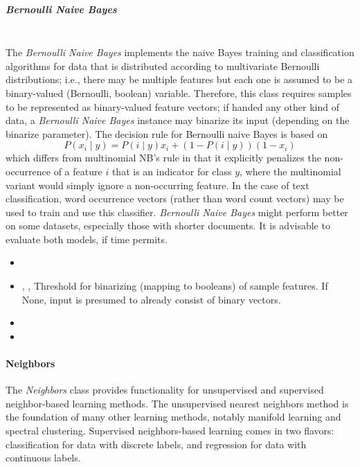 \subparagraph{Bernoulli Naive Bayes}
\mbox{}
\\The \textit{Bernoulli Naive Bayes} implements the naive Bayes training and
classification algorithms for data that is distributed according to multivariate
Bernoulli distributions; i.e., there may be multiple features but each one is
assumed to be a binary-valued (Bernoulli, boolean) variable.
%
Therefore, this class requires samples to be represented as binary-valued
feature vectors; if handed any other kind of data, a \textit{Bernoulli Naive
Bayes} instance may binarize its input (depending on the binarize parameter).
%
The decision rule for Bernoulli naive Bayes is based on
\begin{equation}
P(x_i \mid y) = P(i \mid y) x_i + (1 - P(i \mid y)) (1 - x_i)
\end{equation}
which differs from multinomial NB's rule in that it explicitly penalizes the
non-occurrence of a feature $i$ that is an indicator for class $y$, where the
multinomial variant would simply ignore a non-occurring feature.
%
In the case of text classification, word occurrence vectors (rather than word
count vectors) may be used to train and use this classifier.
%
\textit{Bernoulli Naive Bayes} might perform better on some datasets, especially
those with shorter documents.
%
It is advisable to evaluate both models, if time permits.
%
\begin{itemize}
  \item {}
  \item {}, ,
  Threshold for binarizing (mapping to booleans) of sample features.
  If None, input is presumed to already consist of binary vectors.
  \item {}
  \item {}
\end{itemize}

\paragraph{Neighbors}
\label{Neighbors}

The \textit{Neighbors} class provides functionality for unsupervised and
supervised neighbor-based learning methods.
%
The unsupervised nearest neighbors method is the foundation of many other
learning methods, notably manifold learning and spectral clustering.
%
Supervised neighbors-based learning comes in two flavors: classification for
data with discrete labels, and regression for data with continuous labels.

